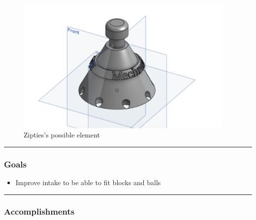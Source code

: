 \begin{figure}[htp]
\centering
\includegraphics[width=0.95\textwidth, angle=0]{Meetings/January/01-17-22/Zip ties element (possibly) - Jensen Miller.PNG}
\caption{Zipties's possible element}
\label{fig:011722_3}
\end{figure}



\noindent\hfil\rule{\textwidth}{.4pt}\hfil
\subsubsection*{Goals}
\begin{itemize}
    \item Improve intake to be able to fit blocks and balls 

\end{itemize} 

\noindent\hfil\rule{\textwidth}{.4pt}\hfil

\subsubsection*{Accomplishments}

